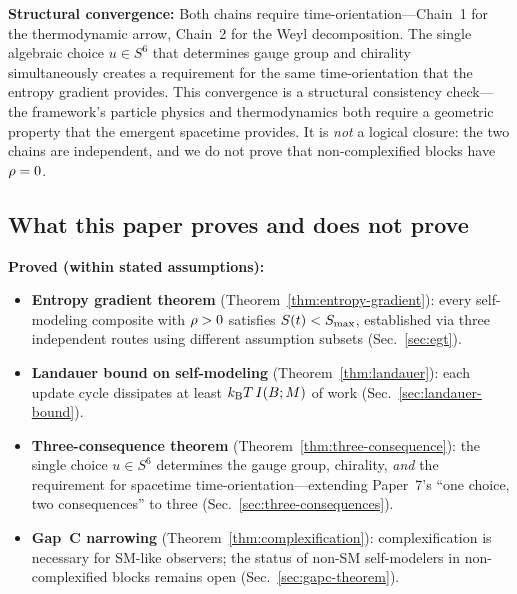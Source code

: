 \medskip\noindent
\textbf{Structural convergence:}
Both chains require time-orientation---Chain~1 for the thermodynamic
arrow, Chain~2 for the Weyl decomposition.  The single algebraic
choice $u \in S^6$ that determines gauge group and
chirality~\cite{Paper7} simultaneously creates a requirement for the
same time-orientation that the entropy gradient provides.  This
convergence is a structural consistency check---the framework's
particle physics and thermodynamics both require a geometric
property that the emergent spacetime provides.  It is \emph{not}
a logical closure:
the two chains are independent, and we do not prove that
non-complexified blocks have $\rho = 0$.

\subsection{What this paper proves and does not prove}
\label{sec:intro-contract}

\noindent\textbf{Proved (within stated assumptions):}
\begin{itemize}
  \item \textbf{Entropy gradient theorem}
    (Theorem~\ref{thm:entropy-gradient}): every self-modeling composite
    with $\rho > 0$ satisfies $S(t) < S_{\max}$, established via three
    independent routes using different assumption subsets
    (Sec.~\ref{sec:egt}).
  \item \textbf{Landauer bound on self-modeling}
    (Theorem~\ref{thm:landauer}): each update cycle dissipates at
    least $k_{\mathrm{B}} T\,I(B;M)$ of work (Sec.~\ref{sec:landauer-bound}).
  \item \textbf{Three-consequence theorem}
    (Theorem~\ref{thm:three-consequence}): the single choice
    $u \in S^6$ determines the gauge group, chirality, \emph{and}
    the requirement for spacetime time-orientation---extending
    Paper~7's ``one choice, two consequences'' to three
    (Sec.~\ref{sec:three-consequences}).
  \item \textbf{Gap~C narrowing}
    (Theorem~\ref{thm:complexification}): complexification is necessary
    for SM-like observers; the status of non-SM self-modelers in
    non-complexified blocks remains open
    (Sec.~\ref{sec:gapc-theorem}).
\end{itemize}

